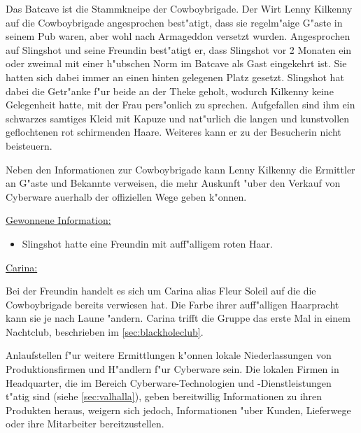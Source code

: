 
Das Batcave ist die Stammkneipe der Cowboybrigade. Der Wirt Lenny Kilkenny auf die Cowboybrigade angesprochen best"atigt, dass sie regelm"a\3ige G"aste in seinem Pub waren, aber wohl nach Armageddon versetzt wurden. Angesprochen auf Slingshot und seine Freundin best"atigt er, dass Slingshot vor 2 Monaten ein oder zweimal mit einer h"ubschen Norm im Batcave als Gast eingekehrt ist. Sie hatten sich dabei immer an einen hinten gelegenen Platz gesetzt. Slingshot hat dabei die Getr"anke f"ur beide an der Theke geholt, wodurch Kilkenny keine Gelegenheit hatte, mit der Frau pers"onlich zu sprechen. Aufgefallen sind ihm ein schwarzes samtiges Kleid mit Kapuze und nat"urlich die langen und kunstvollen geflochtenen rot schirmenden Haare. Weiteres kann er zu der Besucherin nicht beisteuern.

Neben den Informationen zur Cowboybrigade kann Lenny Kilkenny die Ermittler an G"aste und Bekannte verweisen, die mehr Auskunft "uber den Verkauf von Cyberware au\3erhalb der offiziellen Wege geben k"onnen.

\begin{remarks}
	\underline{Gewonnene Information:}
	
	\begin{itemize}
		\item Slingshot hatte eine Freundin mit auff"alligem roten Haar.
	\end{itemize}
	
	\underline{Carina:}

	Bei der Freundin handelt es sich um Carina alias Fleur Soleil auf die die Cowboybrigade bereits verwiesen hat. Die Farbe ihrer auff"alligen Haarpracht kann sie je nach Laune "andern. Carina trifft die Gruppe das erste Mal in einem Nachtclub, beschrieben im \cref{sec:blackholeclub}.
\end{remarks}	


Anlaufstellen f"ur weitere Ermittlungen k"onnen lokale Niederlassungen von Produktionsfirmen und H"andlern f"ur Cyberware sein. Die lokalen Firmen in Headquarter, die im Bereich Cyberware-Technologien und -Dienstleistungen t"atig sind (siehe \cref{sec:valhalla}), geben bereitwillig Informationen zu ihren Produkten heraus, weigern sich jedoch, Informationen "uber Kunden, Lieferwege oder ihre Mitarbeiter bereitzustellen.

